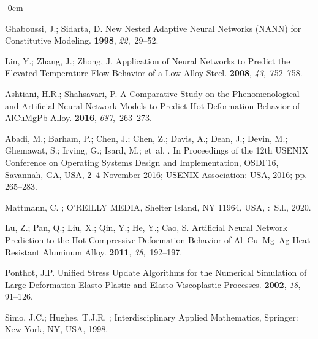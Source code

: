 \documentclass[algorithms,article,accept,pdftex,moreauthors]{Definitions/mdpi}
\begin{document}
\begin{adjustwidth}{-\extralength}{0cm}
\begin{thebibliography}{999}
Ghaboussi, J.; Sidarta, D.
\newblock New Nested Adaptive Neural Networks ({{NANN}}) for Constitutive
  Modeling.
 {\bf 1998}, {\em 22},~29--52.

Lin, Y.; Zhang, J.; Zhong, J.
\newblock Application of Neural Networks to Predict the Elevated Temperature
  Flow Behavior of a Low Alloy Steel.
 {\bf 2008}, {\em 43},~752--758.

Ashtiani, H.R.; Shahsavari, P.
\newblock A Comparative Study on the Phenomenological and Artificial Neural
  Network Models to Predict Hot Deformation Behavior of {{AlCuMgPb}} Alloy.
 {\bf 2016}, {\em
  687},~263--273.

Abadi, M.; Barham, P.; Chen, J.; Chen, Z.; Davis, A.; Dean, J.; Devin, M.;
  Ghemawat, S.; Irving, G.; Isard, M.;  et~al.
.
\newblock In Proceedings of the 12th {{USENIX}} Conference
  on {{Operating Systems Design}} and {{Implementation}}, {OSDI}'16, Savannah, GA, USA, 2--4 November 2016; USENIX Association: 
  {USA}, 2016; pp. 265--283.

Mattmann, C.
; O'REILLY MEDIA, Shelter Island, NY 11964, USA, :~{S.l.},  2020.

Lu, Z.; Pan, Q.; Liu, X.; Qin, Y.; He, Y.; Cao, S.
\newblock Artificial Neural Network Prediction to the Hot Compressive
  Deformation Behavior of {{Al}}--{{Cu}}--{{Mg}}--{{Ag}} Heat-Resistant
  Aluminum Alloy.
 {\bf 2011}, {\em
  38},~192--197.

Ponthot, J.P.
\newblock Unified Stress Update Algorithms for the Numerical Simulation of
  Large Deformation Elasto-Plastic and Elasto-Viscoplastic Processes.
 {\bf 2002}, \emph{18}, 91--126.

Simo, J.C.; Hughes, T.J.R.
; Interdisciplinary Applied
  Mathematics, {Springer}: {New York}, NY, USA,  1998.


\end{thebibliography}
\end{adjustwidth}
\end{document}
